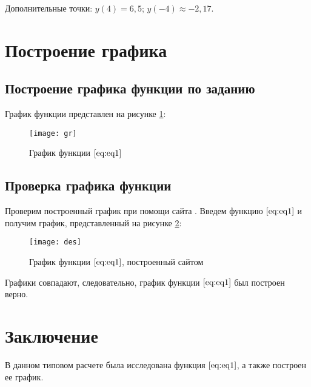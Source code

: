 Дополнительные точки: $y(4) = 6,5$; $y(-4) \approx -2,17.$


\section{Построение графика}
\subsection{Построение графика функции по заданию}

График функции представлен на рисунке \ref{pic:gr}:

\begin{figure}[H]
	\begin{center}
		\texttt{[image: gr]}
		\caption{График функции $\eqref{eq:eq1}$}
		\label{pic:gr} 
	\end{center}
\end{figure}

\subsection{Проверка графика функции}

Проверим построенный график при помощи сайта \cite{desmos}. Введем функцию $\eqref{eq:eq1}$ и получим график, представленный на рисунке \ref{pic:des}:

\begin{figure}[H]
	\begin{center}
		\texttt{[image: des]}
		\caption{График функции $\eqref{eq:eq1}$, построенный сайтом}
		\label{pic:des} 
	\end{center}
\end{figure}

Графики совпадают, следовательно, график функции $\eqref{eq:eq1}$ был построен верно.

\newpage
\section*{Заключение}
В данном типовом расчете была исследована функция $\eqref{eq:eq1}$, а также построен ее график.
